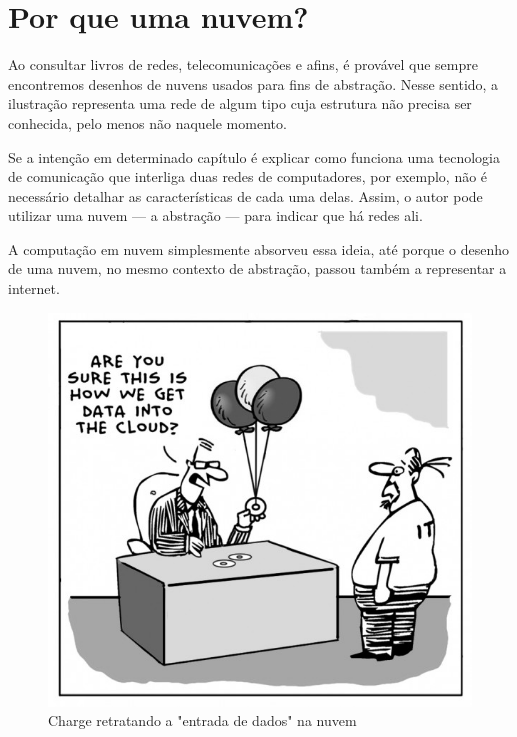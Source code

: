 \section{Por que uma nuvem?}

Ao consultar livros de redes, telecomunicações e afins, é provável que sempre
encontremos desenhos de nuvens usados para fins de abstração. Nesse sentido, a
ilustração representa uma rede de algum tipo cuja estrutura não precisa ser
conhecida, pelo menos não naquele momento.

Se a intenção em determinado capítulo é explicar como funciona uma tecnologia de
comunicação que interliga duas redes de computadores, por exemplo, não é
necessário detalhar as características de cada uma delas. Assim, o autor pode
utilizar uma nuvem --- a abstração --- para indicar que há redes ali.

A computação em nuvem simplesmente absorveu essa ideia, até porque o desenho de
uma nuvem, no mesmo contexto de abstração, passou também a representar a
internet.

\begin{figure}[ht]
    \centering
    \includegraphics[height=0.3\textwidth]{img/comic.jpg}
    \caption{Charge retratando a "entrada de dados" na nuvem}
\end{figure}
